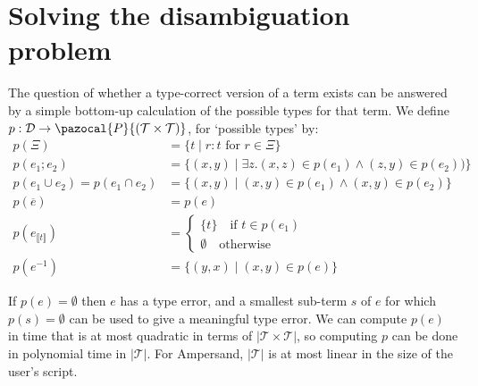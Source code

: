 \documentclass[12pt]{article}
\newcommand{\powerset}{\pazocal{P}}
\newcommand{\typetyped}[2]{{#1}_{\llbracket #2 \rrbracket}}
\newcommand{\conv}[1]{{#1}^{-1}}
\begin{document}
\section{Solving the disambiguation problem}
%
%

The question of whether a type-correct version of a term exists can be answered by a simple bottom-up calculation of the possible types for that term.
We define $p : \mathcal{D} \rightarrow \powerset{\left(\mathcal{T}\times \mathcal{T}\right)}$, for `possible types' by:
\begin{align*}
p(\Xi) &= \{t \mid r : t \text{ for $r\in\Xi$}\}\\
p(e_1; e_2) &= \{(x,y) \mid \exists z. (x,z) \in p(e_1) \wedge (z,y) \in p(e_2))\}\\
p(e_1\cup e_2) = p(e_1\cap e_2) &= \{(x,y) \mid (x,y) \in p(e_1) \wedge (x,y)\in p(e_2)\}\\
p(\overline{e}) &= p(e)\\
p(\typetyped{e}{t}) &= \begin{cases}\{t\}\quad\text{if $t\in p(e_1)$}\\\emptyset\quad\text{otherwise}\end{cases}\\
p(\conv{e}) &= \{(y,x) \mid (x,y)\in p(e)\}
\end{align*}

If $p(e) = \emptyset$ then $e$ has a type error, and a smallest sub-term $s$ of $e$ for which $p(s)=\emptyset$ can be used to give a meaningful type error.
We can compute $p(e)$ in time that is at most quadratic in terms of $\left|\mathcal{T}\times \mathcal{T}\right|$, so computing $p$ can be done in polynomial time in $\left|\mathcal{T}\right|$.
For Ampersand, $\left|\mathcal{T}\right|$ is at most linear in the size of the user's script.
\end{document}
